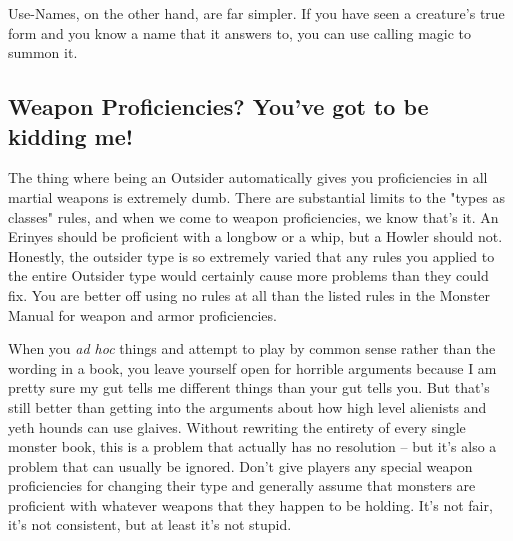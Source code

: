 Use-Names, on the other hand, are far simpler. If you have seen a creature's true form and you know a name that it answers to, you can use calling magic to summon it.

\subsection{Weapon Proficiencies? You've got to be kidding me!}
The thing where being an Outsider automatically gives you proficiencies in all martial weapons is extremely dumb. There are substantial limits to the "types as classes" rules, and when we come to weapon proficiencies, we know that's it. An Erinyes should be proficient with a longbow or a whip, but a Howler should not. Honestly, the outsider type is so extremely varied that any rules you applied to the entire Outsider type would certainly cause more problems than they could fix. You are better off using no rules at all than the listed rules in the Monster Manual for weapon and armor proficiencies.

When you \emph{ad hoc} things and attempt to play by common sense rather than the wording in a book, you leave yourself open for horrible arguments because I am pretty sure my gut tells me different things than your gut tells you. But that's still better than getting into the arguments about how high level alienists and yeth hounds can use glaives. Without rewriting the entirety of every single monster book, this is a problem that actually has no resolution -- but it's also a problem that can usually be ignored. Don't give players any special weapon proficiencies for changing their type and generally assume that monsters are proficient with whatever weapons that they happen to be holding. It's not fair, it's not consistent, but at least it's not stupid.
